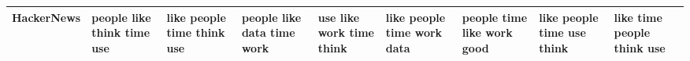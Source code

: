 \documentclass[11pt,a4paper]{article}
\begin{document}
\begin{appendices}
\begin{table}[htb]
\begin{tiny}
\begin{tabular}{|p{}|p{}|p{}|p{}|p{}|p{}|p{}|p{}|p{}|}
    HackerNews & people \newline like \newline think \newline time \newline use & like \newline people \newline time \newline think \newline use & people \newline like \newline data \newline time \newline work & use \newline like \newline work \newline time \newline think & like \newline people \newline time \newline work \newline data & people \newline time \newline like \newline work \newline good & like \newline people \newline time \newline use \newline think & like \newline time \newline people \newline think \newline use\\\hline

\end{tabular}
\end{tiny}
\end{table}
\end{appendices}
\end{document}
